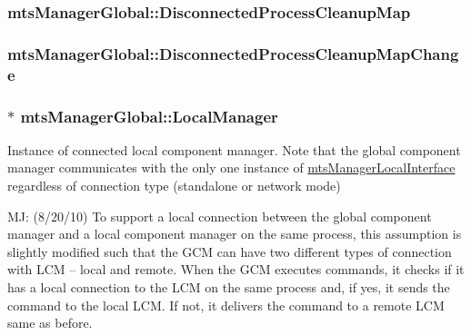 \subsubsection[{Disconnected\+Process\+Cleanup\+Map}]{ mts\+Manager\+Global\+::\+Disconnected\+Process\+Cleanup\+Map\hspace{0.3cm}{\ttfamily [protected]}}\label{classmts_manager_global_ac3feb6deab8ad8d30b35000c776f4a9e}
\hypertarget{classmts_manager_global_a91aa784dfa7f9a8ba3cc4f8964840032}{}
\subsubsection[{Disconnected\+Process\+Cleanup\+Map\+Change}]{ mts\+Manager\+Global\+::\+Disconnected\+Process\+Cleanup\+Map\+Change\hspace{0.3cm}{\ttfamily [protected]}}\label{classmts_manager_global_a91aa784dfa7f9a8ba3cc4f8964840032}
\hypertarget{classmts_manager_global_aedcd7068710cbb38fae05e62b5d57d10}{}
\subsubsection[{Local\+Manager}]{$\ast$ mts\+Manager\+Global\+::\+Local\+Manager\hspace{0.3cm}{\ttfamily [protected]}}\label{classmts_manager_global_aedcd7068710cbb38fae05e62b5d57d10}
Instance of connected local component manager. Note that the global component manager communicates with the only one instance of \hyperlink{classmts_manager_local_interface}{mts\+Manager\+Local\+Interface} regardless of connection type (standalone or network mode)

M\+J\+: (8/20/10) To support a local connection between the global component manager and a local component manager on the same process, this assumption is slightly modified such that the G\+C\+M can have two different types of connection with L\+C\+M -- local and remote. When the G\+C\+M executes commands, it checks if it has a local connection to the L\+C\+M on the same process and, if yes, it sends the command to the local L\+C\+M. If not, it delivers the command to a remote L\+C\+M same as before. \hypertarget{classmts_manager_global_a3d6e45758c38a5b82664675f9f58fcc8}{}
